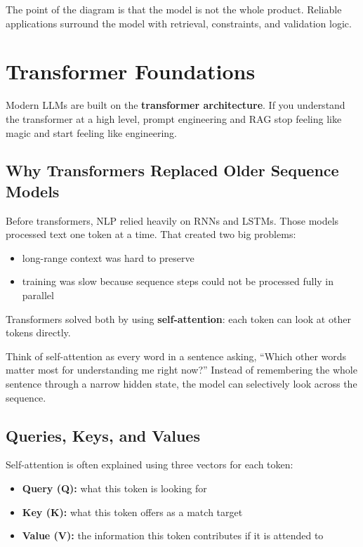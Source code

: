 \documentclass[12pt, a4paper, oneside]{book}
\begin{document}
The point of the diagram is that the model is not the whole product. Reliable applications surround the model with retrieval, constraints, and validation logic.

\section{Transformer Foundations}

Modern LLMs are built on the \textbf{transformer architecture}. If you understand the transformer at a high level, prompt engineering and RAG stop feeling like magic and start feeling like engineering.

\subsection{Why Transformers Replaced Older Sequence Models}

Before transformers, NLP relied heavily on RNNs and LSTMs. Those models processed text one token at a time. That created two big problems:
\begin{itemize}[leftmargin=2em]
    \item long-range context was hard to preserve
    \item training was slow because sequence steps could not be processed fully in parallel
\end{itemize}

Transformers solved both by using \textbf{self-attention}: each token can look at other tokens directly.

\begin{intuitionbox}
Think of self-attention as every word in a sentence asking, ``Which other words matter most for understanding me right now?'' Instead of remembering the whole sentence through a narrow hidden state, the model can selectively look across the sequence.
\end{intuitionbox}

\subsection{Queries, Keys, and Values}

Self-attention is often explained using three vectors for each token:
\begin{itemize}[leftmargin=2em]
    \item \textbf{Query (Q):} what this token is looking for
    \item \textbf{Key (K):} what this token offers as a match target
    \item \textbf{Value (V):} the information this token contributes if it is attended to
\end{itemize}
\end{document}
